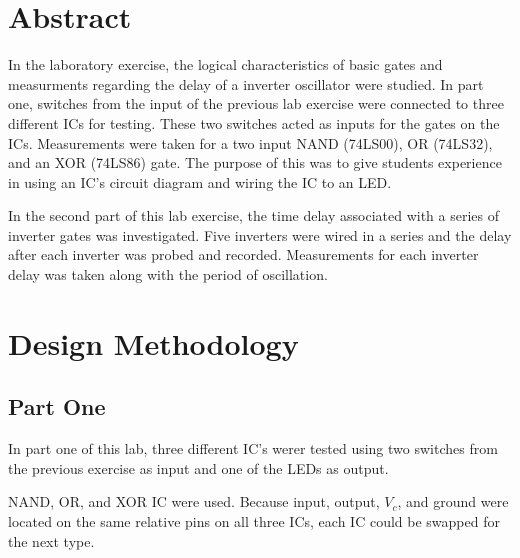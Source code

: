 \documentclass[CMPE]{KGCOEReport}
\begin{document}
\maketitle

\section*{Abstract}
In the laboratory exercise, the logical characteristics of basic gates and measurments regarding the delay of a inverter oscillator were studied. In part one, switches from the input of the previous lab exercise were connected to three different ICs for testing. These two switches acted as inputs for the gates on the ICs. Measurements were taken for a two input NAND (74LS00), OR (74LS32), and an XOR (74LS86) gate. The purpose of this was to give students experience in using an IC's circuit diagram and wiring the IC to an LED. \par 
In the second part of this lab exercise, the time delay associated with a series of inverter gates was investigated. Five inverters were wired in a series and the delay after each inverter was probed and recorded. Measurements for each inverter delay was taken along with the period of oscillation.

\section*{Design Methodology}

\subsection*{Part One}
In part one of this lab, three different IC's werer tested using two switches from the previous exercise as input and one of the LEDs as output. \par
NAND, OR, and XOR IC were used. Because input, output, \(V_c\), and ground were located on the same relative pins on all three ICs, each IC could be swapped for the next type.
\end{document}
